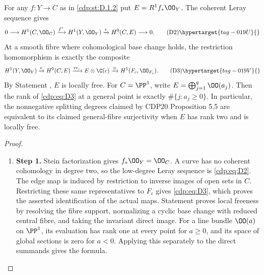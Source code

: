 \begin{proposition}\hypertarget{tag-01G2}{}\label{cdp:st:D.1.4}

For any $f:Y\to C$ as in \ref{cdp:st:D.1.2} put $E=R^1f_*\OO_Y$.
The coherent Leray sequence gives
\[
0\longrightarrow H^1(C,\OO_C)\xrightarrow{f^*}H^1(Y,\OO_Y)
\xrightarrow{e}H^0(C,E)\longrightarrow0.               \tag{D2}\hypertarget{tag-019U}{}\label{cdp:eq:D2}
\]
At a smooth fibre where cohomological base change holds, the
restriction homomorphism is exactly the composite
\[
H^1(Y,\OO_Y)\xrightarrow{e}H^0(C,E)
\xrightarrow{\operatorname{ev}_c}E\otimes\C(c)
\xrightarrow{\simeq}H^1(F_c,\OO_{F_c}).               \tag{D3}\hypertarget{tag-019V}{}\label{cdp:eq:D3}
\]
By Statement , $E$ is locally free. For $C=\PP^1$, write
$E=\bigoplus_{j=1}^q\OO(a_j)$.
Then the rank of \eqref{cdp:eq:D3} at a general point is exactly
$\#\{j:a_j\geq0\}$. In particular, the nonnegative splitting
degrees claimed by CDP20 Proposition 5.5 are equivalent to its
claimed general-fibre surjectivity when $E$ has rank two and is
locally free.
\end{proposition}


\begin{proof}
\begin{enumerate}[label={$\langle1\rangle$\arabic*.},leftmargin=*]
\item 
\noindent\textbf{Step 1.} Stein factorization gives $f_*\OO_Y=\OO_C$. A curve has no coherent
cohomology in degree two, so the low-degree Leray sequence is \eqref{cdp:eq:D2}.
The edge map is induced by restriction to inverse images of open
sets in $C$. Restricting these same representatives to $F_c$ gives
\eqref{cdp:eq:D3}, which proves the asserted identification of the actual maps.
Statement  proves local freeness by resolving the fibre support,
normalizing a cyclic base change with reduced central fibre, and
taking the invariant direct image. For a line bundle
$\OO(a)$ on $\PP^1$, its evaluation has rank one at every point
for $a\geq0$, and its space of global sections is zero for $a<0$.
Applying this separately to the direct summands gives the formula.

\end{enumerate}
\end{proof}